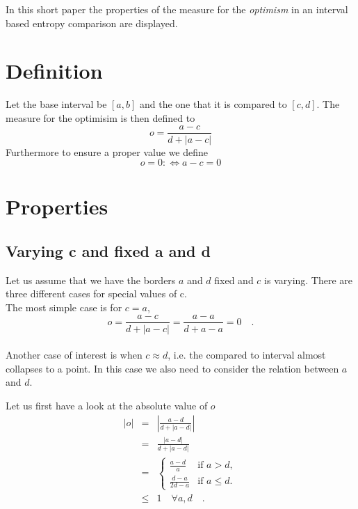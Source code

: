 \documentclass[a4paper]{article}
\begin{document}
In this short paper the properties of the measure for the \emph{optimism} in an interval based entropy comparison are displayed.\\

\section{Definition}

Let the base interval be $[a,b]$ and the one that it is compared to $[c,d]$. The measure for the optimisim is then defined to
\begin{displaymath}
o = \frac{a-c}{d+ |a-c|}
\end{displaymath}
Furthermore to ensure a proper value we define 
\begin{displaymath}
o = 0 :\Leftrightarrow a - c = 0
\end{displaymath}

\section{Properties}


\subsection{Varying c and fixed a and d}
Let us assume that we have the borders $a$ and $d$ fixed and $c$ is varying. There are three different cases for special values of c.\\

The most simple case is for $c = a$,
\begin{displaymath}
o = \frac{a-c}{d+ |a-c|} = \frac{a-a}{d+a-a} = 0 \quad \textrm{.}
\end{displaymath}\\

Another case of interest is when $c \approx d$, i.e. the compared to interval almost collapses to a point. In this case we also need to consider the relation between $a$ and $d$.

Let us first have a look at the absolute value of $o$
\begin{eqnarray*}
|o| & = & \left| \frac{a-d}{d+|a-d|} \right|\\
& =& \frac{|a-d|}{d+|a-d|}\\
& = & \left\{ 
\begin{array}{rl}
\frac{a-d}{a} & \text{if } a > d,\\
\frac{d-a}{2d-a} & \text{if } a \leq d.
\end{array}
\right.\\
& \leq & 1 \quad \forall a,d \quad \textrm{.} 
\end{eqnarray*}
\end{document}
